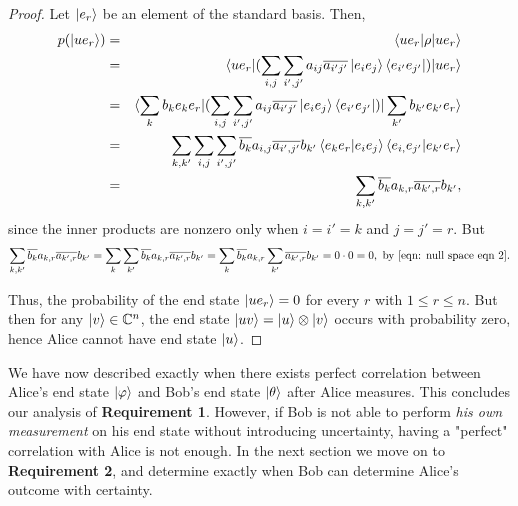 \begin{proof}




Let $\ket{e_r}$ be an element of the standard basis.  Then,
\begin{eqnarray*}
p(\ket{ue_r})&=&\braket{ue_r | \rho |ue_r}\\
&=&\braket{ue_r| (\sum_{i,j} \sum_{i',j'} a_{ij} \overline{a_{i'j'}}\ket{e_i e_j}\bra{e_{i'} e_{j'}})|ue_r} \\
&=&\braket{\sum_k b_ke_k e_r| (\sum_{i,j} \sum_{i',j'} a_{ij} \overline{a_{i'j'}}\ket{e_i e_j}\bra{e_{i'} e_{j'}})|\sum_{k'}b_{k'}e_{k'}e_r}\\
&=&\sum_{k,k'}\sum_{i,j}\sum_{i',j'}\overline{b_k}a_{i,j}\overline{a_{i',j'}}b_{k'}\braket{e_k e_r|e_i e_j}\braket{e_{i,}e_{j'}|e_{k'}e_r}\\
&=&\sum_{k,k'}\overline{b_k}a_{k,r}\overline{a_{k',r}}b_{k'},
\end{eqnarray*}
since the inner products are nonzero only when $i=i'=k$ and $j=j'=r$.  But
\begin{equation*}
\sum_{k,k'}\overline{b_k}a_{k,r}\overline{a_{k',r}}b_{k'}=\sum_k \sum_{k'} \overline{b_k}a_{k,r}\overline{a_{k',r}}b_{k'}
=\sum_k \overline{b_k}a_{k,r} \sum_{k'}\overline{a_{k',r}}b_{k'}
=0\cdot 0=0, \textrm{ by }\eqref{eqn: null space eqn 2}.
\end{equation*}

Thus, the probability of the end state $\ket{u e_r}=0$ for every $r$ with $1\leq r \leq n$.  But then for any $\ket{v} \in {\mathbb{C}}^n$, the end state $\ket{uv} = \ket{u}\otimes\ket{v}$ occurs with probability zero, hence Alice cannot have end state $\ket{u}$.
\end{proof}

We have now described exactly when there exists perfect correlation between Alice's end state $\ket{\varphi}$ and Bob's end state $\ket{\theta}$ after Alice measures.  This concludes our analysis of {\bf{Requirement 1}}.  However, if Bob is not able to perform {\emph{his own measurement}} on his end state without introducing uncertainty, having a "perfect" correlation with Alice is not enough. In the next section we move on to {\bf{Requirement 2}}, and determine exactly when Bob can determine Alice's outcome with certainty.


